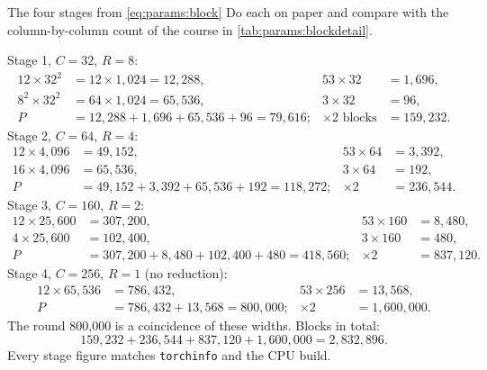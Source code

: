 \begin{worked}{The four stages from \texorpdfstring{\eqref{eq:params:block}}{the block formula}}\label{we:params:blocks}
Do each on paper and compare with the column-by-column count of the course in
\cref{tab:params:blockdetail}.

Stage 1, $C = 32$, $R = 8$:
\begin{align*}
12 \times 32^2 &= 12 \times 1{,}024 = 12{,}288, & 53 \times 32 &= 1{,}696,\\
8^2 \times 32^2 &= 64 \times 1{,}024 = 65{,}536, & 3 \times 32 &= 96,\\
P &= 12{,}288 + 1{,}696 + 65{,}536 + 96 = 79{,}616; & \times 2 \text{ blocks} &= 159{,}232 .
\end{align*}
Stage 2, $C = 64$, $R = 4$:
\begin{align*}
12 \times 4{,}096 &= 49{,}152, & 53 \times 64 &= 3{,}392,\\
16 \times 4{,}096 &= 65{,}536, & 3 \times 64 &= 192,\\
P &= 49{,}152 + 3{,}392 + 65{,}536 + 192 = 118{,}272; & \times 2 &= 236{,}544 .
\end{align*}
Stage 3, $C = 160$, $R = 2$:
\begin{align*}
12 \times 25{,}600 &= 307{,}200, & 53 \times 160 &= 8{,}480,\\
4 \times 25{,}600 &= 102{,}400, & 3 \times 160 &= 480,\\
P &= 307{,}200 + 8{,}480 + 102{,}400 + 480 = 418{,}560; & \times 2 &= 837{,}120 .
\end{align*}
Stage 4, $C = 256$, $R = 1$ (no reduction):
\begin{align*}
12 \times 65{,}536 &= 786{,}432, & 53 \times 256 &= 13{,}568,\\
P &= 786{,}432 + 13{,}568 = 800{,}000; & \times 2 &= 1{,}600{,}000 .
\end{align*}
The round 800,000 is a coincidence of these widths. Blocks in total:
\[
159{,}232 + 236{,}544 + 837{,}120 + 1{,}600{,}000 = 2{,}832{,}896 .
\]
Every stage figure matches \texttt{torchinfo} and the CPU build.
\end{worked}

